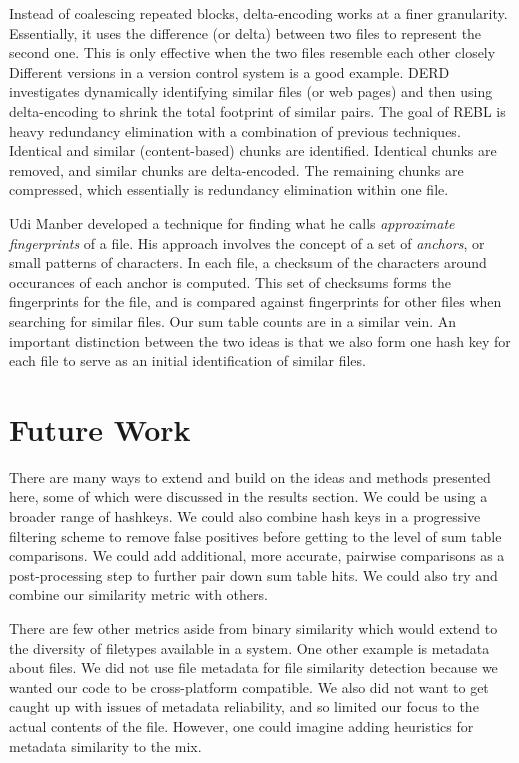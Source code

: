 \documentclass[10pt, twocolumn]{article}
\begin{document}
Instead of coalescing repeated blocks, delta-encoding works at a finer granularity. Essentially, it uses the difference (or delta) between two files to represent the second one. This is only effective when the two files resemble each other closely Different versions in a version control system is a good example. DERD \cite{derd} investigates dynamically identifying similar files (or web pages) and then using delta-encoding to shrink the total footprint of similar pairs. The goal of REBL \cite{rebl} is heavy redundancy elimination with a combination of previous techniques. Identical and similar (content-based) chunks are identified. Identical chunks are removed, and similar chunks are delta-encoded. The remaining chunks are compressed, which essentially is redundancy elimination within one file.

Udi Manber \cite{manber} developed a technique for finding what he calls \emph{approximate fingerprints} of a file. His approach involves the concept of a set of \emph{anchors}, or small patterns of characters. In each file, a checksum of the characters around occurances of each anchor is computed. This set of checksums forms the fingerprints for the file, and is compared against fingerprints for other files when searching for similar files. Our sum table counts are in a similar vein. An important distinction between the two ideas is that we also form one hash key for each file to serve as an initial identification of similar files. 

\section{Future Work}

There are many ways to extend and build on the ideas and methods presented here, some of which were discussed in the results section. We could be using a broader range of hashkeys. We could also combine hash keys in a progressive filtering scheme to remove false positives before getting to the level of sum table comparisons. We could add additional, more accurate, pairwise comparisons as a post-processing step to further pair down sum table hits. We could also try and combine our similarity metric with others.

There are few other metrics aside from binary similarity which would extend to the diversity of filetypes available in a system. One other example is metadata about files. We did not use file metadata for file similarity detection because we wanted our code to be cross-platform compatible. We also did not want to get caught up with issues of metadata reliability, and so limited our focus to the actual contents of the file. However, one could imagine adding heuristics for metadata similarity to the mix. 
\end{document}
